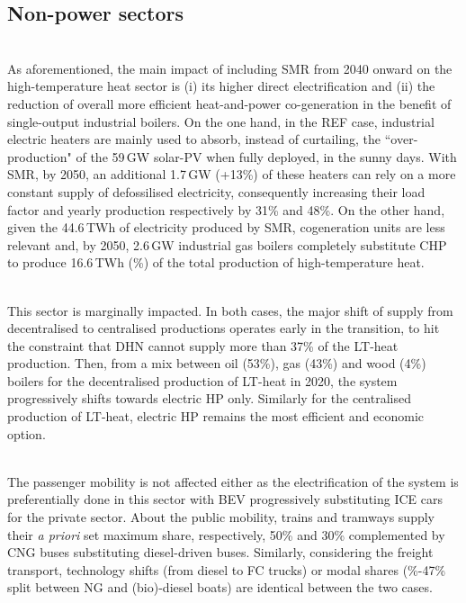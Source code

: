 \subsection{Non-power sectors}
\label{subsec:atom_mol:results_deter_others}

\\

As aforementioned, the main impact of including \gls{SMR} from 2040 onward on the high-temperature heat sector is (i) its higher direct electrification and (ii) the reduction of overall more efficient heat-and-power co-generation in the benefit of single-output industrial boilers. On the one hand, in the REF case, industrial electric heaters are mainly used to absorb, instead of curtailing, the ``over-production" of the 59\,GW solar-PV when fully deployed, in the sunny days. With \gls{SMR}, by 2050, an additional 1.7\,GW (+13\%) of these heaters can rely on a more constant supply of defossilised electricity, consequently increasing their load factor and yearly production respectively by 31\% and 48\%. On the other hand, given the 44.6\,TWh of electricity produced by \gls{SMR}, cogeneration units are less relevant and, by 2050, 2.6\,GW industrial gas boilers completely substitute \gls{CHP} to produce 16.6\,TWh (\%) of the total production of high-temperature heat.

\\

This sector is marginally impacted. In both cases, the major shift of supply from decentralised to centralised productions operates early in the transition, to hit the constraint that \gls{DHN} cannot supply more than 37\% of the \gls{LT}-heat production. Then, from a mix between oil (53\%), gas (43\%) and wood (4\%) boilers for the decentralised production of \gls{LT}-heat in 2020, the system progressively shifts towards electric \gls{HP} only. Similarly for the centralised production of \gls{LT}-heat, electric \gls{HP} remains the most efficient and economic option.

\\

The passenger mobility is not affected either as the electrification of the system is preferentially done in this sector with \gls{BEV} progressively substituting \gls{ICE} cars for the private sector. About the public mobility, trains and tramways supply their \textit{a priori} set maximum share, respectively, 50\% and 30\% complemented by \gls{CNG} buses substituting diesel-driven buses. Similarly, considering the freight transport, technology shifts (\ie from diesel to \gls{FC} trucks) or modal shares (\%-47\% split between \gls{NG} and (bio)-diesel boats) are identical between the two cases.

